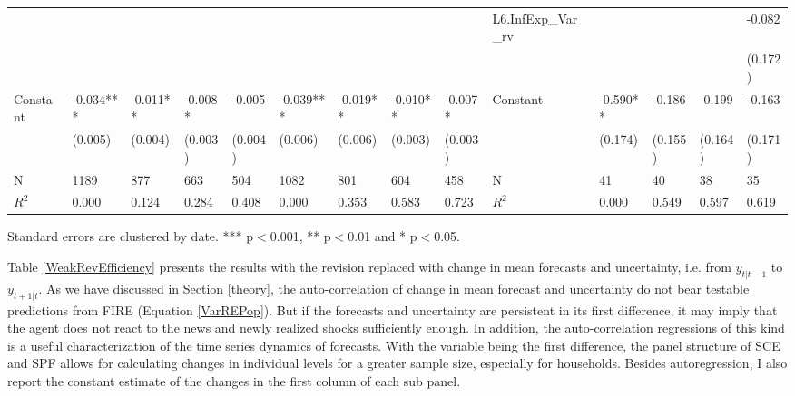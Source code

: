 \documentclass[12pt]{article}
\begin{document}
\begin{table}
\begin{adjustbox}{width={24cm},totalheight={14cm}}
\begin{threeparttable}
\begin{tabular}{llllllllllllll}
					&               &           &          &          &               &           &           &           & L6.InfExp\_Var\_rv  &               &          &          & -0.082   \\
					&               &           &          &          &               &           &           &           &                     &               &          &          & (0.172)  \\
					Constant               & -0.034***     & -0.011**  & -0.008*  & -0.005   & -0.039***     & -0.019**  & -0.010**  & -0.007*   & Constant               & -0.590**      & -0.186   & -0.199   & -0.163   \\
					& (0.005)       & (0.004)   & (0.003)  & (0.004)  & (0.006)       & (0.006)   & (0.003)   & (0.003)   &                     & (0.174)       & (0.155)  & (0.164)  & (0.171)  \\
					\hline 
					N                   & 1189          & 877       & 663      & 504      & 1082          & 801       & 604       & 458       & N                   & 41            & 40       & 38       & 35       \\
					$R^2$               & 0.000         & 0.124     & 0.284    & 0.408    & 0.000         & 0.353     & 0.583     & 0.723     & $R^2$               & 0.000         & 0.549    & 0.597    & 0.619 \\
					\hline    
				\end{tabular}
					\begin{tablenotes}
						\item Standard errors are clustered by date. *** p$<$0.001, ** p$<$0.01 and * p$<$0.05. 
					\end{tablenotes}
				\end{threeparttable}
				\end{adjustbox}
		\end{table}
	
	
	Table \ref{WeakRevEfficiency} presents the results with the revision replaced with change in mean forecasts and uncertainty, i.e. from $y_{t|t-1}$ to $y_{t+1|t}$. As we have discussed in Section \ref{theory}, the auto-correlation of change in mean forecast and uncertainty do not bear testable predictions from FIRE (Equation \ref{VarREPop}). But if the  forecasts and uncertainty are persistent in its first difference, it may imply that the agent does not react to the news and newly realized shocks sufficiently enough. In addition, the auto-correlation regressions of this kind is a useful characterization of the time series dynamics of forecasts. With the variable being the first difference, the panel structure of SCE and SPF allows for calculating changes in individual levels for a greater sample size, especially for households. Besides autoregression, I also report the constant estimate of the changes in the first column of each sub panel. 
	
\end{document}
